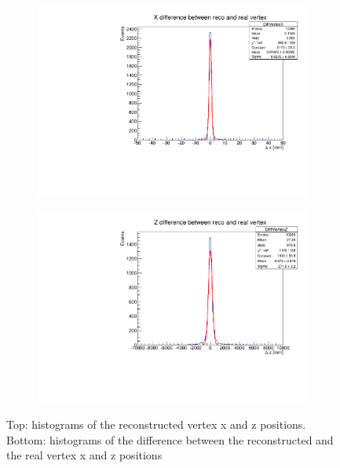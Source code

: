 \begin{figure}
\begin{subfigure}{0.5\textwidth}
\end{subfigure}\\
\begin{subfigure}{0.5\textwidth}
\includegraphics[width=\textwidth]{cdaxdiff}
\end{subfigure}
\begin{subfigure}{0.5\textwidth}
\includegraphics[width=\textwidth]{cdazdiff}
\end{subfigure}
\caption{Top: histograms of the reconstructed vertex x and z positions. Bottom: histograms of the
difference between the reconstructed and the real vertex x and z
positions}\label{vertexcdavalidation}
\end{figure}

